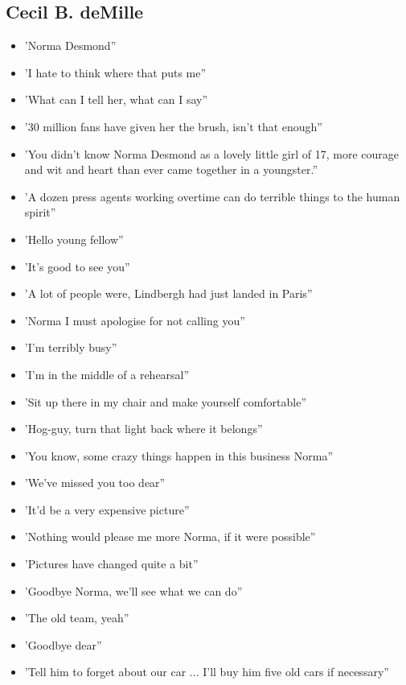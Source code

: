 \documentclass[a4paper]{article}
\begin{document}
\subsection{Cecil B. deMille}
\begin{itemize}
\item 'Norma Desmond”
\item 'I hate to think where that puts me”
\item 'What can I tell her, what can I say”
\item '30 million fans have given her the brush, isn’t that enough”
\item 'You didn’t know Norma Desmond as a lovely little girl of 17, more courage and wit and heart than ever came together in a youngster.”
\item 'A dozen press agents working overtime can do terrible things to the human spirit”
\item 'Hello young fellow”
\item 'It’s good to see you”
\item 'A lot of people were, Lindbergh had just landed in Paris”
\item 'Norma I must apologise for not calling you”
\item 'I’m terribly busy”
\item 'I’m in the middle of a rehearsal”
\item 'Sit up there in my chair and make yourself comfortable”
\item 'Hog-guy, turn that light back where it belongs”
\item 'You know, some crazy things happen in this business Norma”
\item 'We've missed you too dear”
\item 'It’d be a very expensive picture”
\item 'Nothing would please me more Norma, if it were possible”
\item 'Pictures have changed quite a bit”
\item 'Goodbye Norma, we’ll see what we can do”
\item 'The old team, yeah”
\item 'Goodbye dear”
\item 'Tell him to forget about our car ... I'll buy him five old cars if necessary”
\end{itemize}
\end{document}
